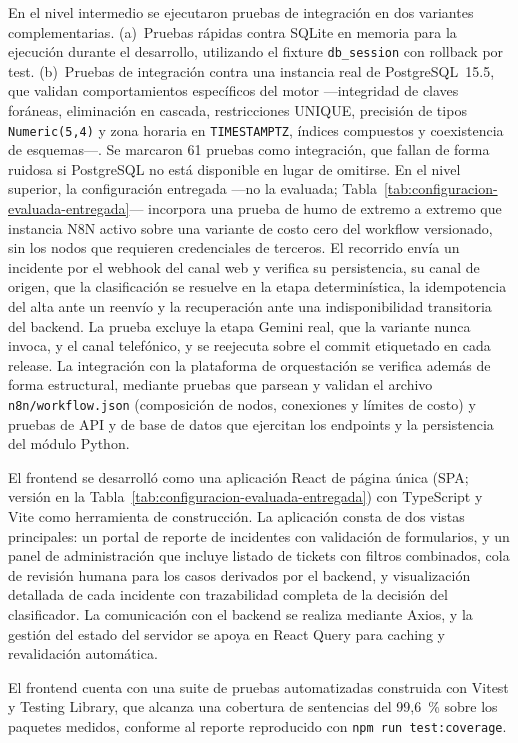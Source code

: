 En el nivel intermedio se ejecutaron pruebas de integración en dos variantes complementarias. (a)~Pruebas rápidas contra SQLite en memoria para la ejecución durante el desarrollo, utilizando el fixture \texttt{db\_session} con rollback por test. (b)~Pruebas de integración contra una instancia real de PostgreSQL~15.5, que validan comportamientos específicos del motor ---integridad de claves foráneas, eliminación en cascada, restricciones UNIQUE, precisión de tipos \texttt{Numeric(5,4)} y zona horaria en \texttt{TIMESTAMPTZ}, índices compuestos y coexistencia de esquemas---. Se marcaron 61 pruebas como integración, que fallan de forma ruidosa si PostgreSQL no está disponible en lugar de omitirse. En el nivel superior, la configuración entregada ---no la evaluada; Tabla~\ref{tab:configuracion-evaluada-entregada}--- incorpora una prueba de humo de extremo a extremo que instancia N8N activo sobre una variante de costo cero del workflow versionado, sin los nodos que requieren credenciales de terceros. El recorrido envía un incidente por el webhook del canal web y verifica su persistencia, su canal de origen, que la clasificación se resuelve en la etapa determinística, la idempotencia del alta ante un reenvío y la recuperación ante una indisponibilidad transitoria del backend. La prueba excluye la etapa Gemini real, que la variante nunca invoca, y el canal telefónico, y se reejecuta sobre el commit etiquetado en cada release. La integración con la plataforma de orquestación se verifica además de forma estructural, mediante pruebas que parsean y validan el archivo \texttt{n8n/workflow.json} (composición de nodos, conexiones y límites de costo) y pruebas de API y de base de datos que ejercitan los endpoints y la persistencia del módulo Python.

El frontend se desarrolló como una aplicación React de página única (SPA; versión en la Tabla~\ref{tab:configuracion-evaluada-entregada}) con TypeScript y Vite como herramienta de construcción. La aplicación consta de dos vistas principales: un portal de reporte de incidentes con validación de formularios, y un panel de administración que incluye listado de tickets con filtros combinados, cola de revisión humana para los casos derivados por el backend, y visualización detallada de cada incidente con trazabilidad completa de la decisión del clasificador. La comunicación con el backend se realiza mediante Axios, y la gestión del estado del servidor se apoya en React Query para caching y revalidación automática.

El frontend cuenta con una suite de pruebas automatizadas construida con Vitest y Testing Library, que alcanza una cobertura de sentencias del 99,6~\% sobre los paquetes medidos, conforme al reporte reproducido con \texttt{npm run test:coverage}.

